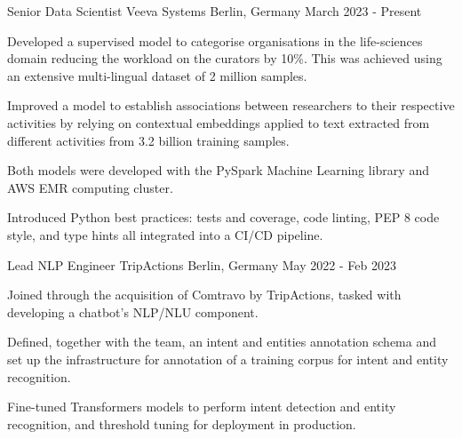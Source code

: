 

\begin{cventries}
  \cventry
    {Senior Data Scientist} %
    {Veeva Systems} %
    {Berlin, Germany} %
    {March 2023 - Present } %
	{
      \begin{cvitems} %
		\item {Developed a supervised model to categorise organisations in the life-sciences domain reducing the workload on the curators by 10\%. This was achieved using an extensive multi-lingual dataset of 2 million samples.}
		\item {Improved a model to establish associations between researchers to their respective activities by relying on contextual embeddings applied to text extracted from different activities from 3.2 billion training samples.}
		\item {Both models were developed with the PySpark Machine Learning library and AWS EMR computing cluster.}
		\item {Introduced Python best practices: tests and coverage, code linting, PEP 8 code style, and type hints all integrated into a CI/CD pipeline.}
      \end{cvitems}
    }


  \cventry
    {Lead NLP Engineer} %
    {TripActions} %
    {Berlin, Germany} %
    {May 2022 - Feb 2023} %
	{
      \begin{cvitems} %
		\item {Joined through the acquisition of Comtravo by TripActions, tasked with developing a chatbot's NLP/NLU component.}
		\item {Defined, together with the team, an intent and entities annotation schema and set up the infrastructure for annotation of a training corpus for intent and entity recognition.}
		\item {Fine-tuned Transformers models to perform intent detection and entity recognition, and threshold tuning for deployment in production.}
      \end{cvitems}
    }



\end{cventries}
